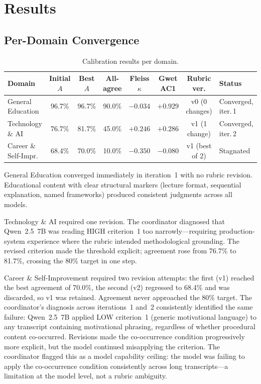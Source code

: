 \documentclass[11pt]{article}
\begin{document}
\section{Results}
\label{sec:results}

\subsection{Per-Domain Convergence}

\begin{table}[ht]
\centering
\caption{Calibration results per domain.}
\label{tab:results}
\footnotesize
\setlength{\tabcolsep}{4pt}
\begin{tabular}{lccccccl}
\toprule
\textbf{Domain} &
\textbf{Initial $A$} &
\textbf{Best $A$} &
\textbf{All-agree} &
\textbf{Fleiss $\kappa$} &
\textbf{Gwet AC1} &
\textbf{Rubric ver.} &
\textbf{Status} \\
\midrule
General Education    & 96.7\% & 96.7\% & 90.0\% & $-0.034$ & $+0.929$ & v0 (0 changes) & Converged, iter.\,1 \\
Technology \& AI     & 76.7\% & 81.7\% & 45.0\% & $+0.246$  & $+0.286$ & v1 (1 change)  & Converged, iter.\,2 \\
Career \& Self-Impr. & 68.4\% & 70.0\% & 10.0\% & $-0.350$  & $-0.080$ & v1 (best of 2) & Stagnated \\
\bottomrule
\end{tabular}
\end{table}

General Education converged immediately in iteration~1 with no rubric revision.
Educational content with clear structural markers (lecture format, sequential
explanation, named frameworks) produced consistent judgments across all models.

Technology \& AI required one revision. The coordinator diagnosed that
Qwen~2.5~7B was reading HIGH criterion~1 too narrowly---requiring
production-system experience where the rubric intended methodological grounding.
The revised criterion made the threshold explicit; agreement rose from 76.7\%
to 81.7\%, crossing the 80\% target in one step.

Career \& Self-Improvement required two revision attempts: the first (v1) reached the best
agreement of 70.0\%, the second (v2) regressed to 68.4\% and was discarded, so v1 was retained.
Agreement never approached the 80\% target.
The coordinator's diagnosis across iterations~1 and~2 consistently identified the
same failure: Qwen~2.5~7B applied LOW criterion~1 (generic motivational
language) to any transcript containing motivational phrasing, regardless of
whether procedural content co-occurred. Revisions made the co-occurrence
condition progressively more explicit, but the model continued misapplying the
criterion. The coordinator flagged this as a model capability ceiling: the
model was failing to apply the co-occurrence condition consistently across long transcripts---a limitation at the model level, not a rubric
ambiguity.
\end{document}
